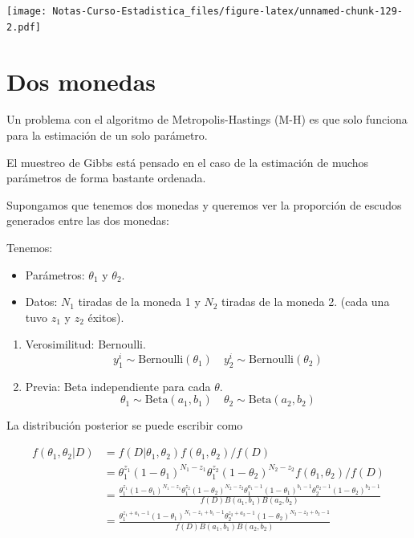 \documentclass[
  12pt,
]{book}
\providecommand{\tightlist}{%
  \setlength{\itemsep}{0pt}\setlength{\parskip}{0pt}}
\theoremstyle{definition}
\theoremstyle{definition}
\theoremstyle{definition}
\theoremstyle{remark}
\begin{document}
\texttt{[image: Notas-Curso-Estadistica\_files/figure-latex/unnamed-chunk-129-2.pdf]}

\hypertarget{dos-monedas}{%
\section{Dos monedas}\label{dos-monedas}}

Un problema con el algoritmo de Metropolis-Hastings (M-H) es que solo funciona para la estimación de un solo parámetro.

El muestreo de Gibbs está pensado en el caso de la estimación de muchos parámetros de forma bastante ordenada.

Supongamos que tenemos dos monedas y queremos ver la proporción de escudos generados entre las dos monedas:

Tenemos:

\begin{itemize}
\tightlist
\item
  Parámetros: \(\theta_{1}\) y \(\theta_{2}\).
\item
  Datos: \(N_{1}\) tiradas de la moneda 1 y \(N_{2}\) tiradas de la moneda 2. (cada una tuvo \(z_{1}\) y \(z_{2}\) éxitos).
\end{itemize}

\begin{enumerate}
\def\labelenumi{\arabic{enumi}.}
\setcounter{enumi}{2}
\item
  Verosimilitud: Bernoulli.
  \begin{equation*}
  y_{1}^{i}\sim \mathrm{Bernoulli}(\theta_{1}) 
  \quad 
  y_{2}^{i}\sim \mathrm{Bernoulli}(\theta_{2}) 
  \end{equation*}
\item
  Previa: Beta independiente para cada \(\theta\).
  \begin{equation*}
  \theta_{1}\sim \mathrm{Beta}(a_{1},b_{1}) 
  \quad 
  \theta_{2}\sim \mathrm{Beta}(a_{2},b_{2}) 
  \end{equation*}
\end{enumerate}

La distribución posterior se puede escribir como

\begin{align*}
f\left(\theta_{1}, \theta_{2} | D\right) &=f\left(D | \theta_{1}, \theta_{2}\right) f\left(\theta_{1}, \theta_{2}\right) / f(D) \\
&=\theta_{1}^{z_{1}}\left(1-\theta_{1}\right)^{N_{1}-z_{1}} \theta_{1}^{z_{2}}\left(1-\theta_{2}\right)^{N_{2}-z_{2}} f\left(\theta_{1}, \theta_{2}\right) / f(D) \\
&=\frac{\theta_{1}^{z_{1}}\left(1-\theta_{1}\right)^{N_{1}-z_{1}} \theta_{1}^{z_{2}}\left(1-\theta_{2}\right)^{N_{2}-z_{2}} \theta_{1}^{a_{1}-1}\left(1-\theta_{1}\right)^{b_{1}-1} \theta_{2}^{a_{2}-1}\left(1-\theta_{2}\right)^{b_{2}-1}}{f(D) B\left(a_{1}, b_{1}\right) B\left(a_{2}, b_{2}\right)} \\
&=\frac{\theta_{1}^{z_{1}+a_{1}-1}\left(1-\theta_{1}\right)^{N_{1}-z_{1}+b_{1}-1} \theta_{2}^{z_{2}+a_{2}-1}\left(1-\theta_{2}\right)^{N_{2}-z_{2}+b_{2}-1}}{f(D) B\left(a_{1}, b_{1}\right) B\left(a_{2}, b_{2}\right)}
\end{align*}
\end{document}
